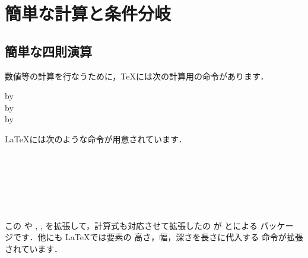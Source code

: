 \section{簡単な計算と条件分岐}



\subsection{簡単な四則演算\zdash{}}


数値等の計算を行なうために，\TeX には次の計算用の命令があります．

\begin{Syntax}
 by \\
 by \\
 by 
\end{Syntax}

\LaTeX には次のような命令が用意されています．

\begin{Syntax}
 \\
 \\
 \\
 \\
 \\
\end{Syntax}

この  や , 
,  を拡張して，計算式も対応させて拡張したの
が とによる  パッケー
ジです．他にも \LaTeX では要素の 高さ，幅，深さを長さに代入する
命令が拡張されています．

